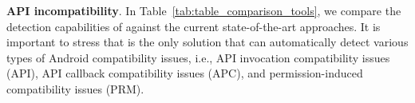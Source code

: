 \begin{comment}
These research efforts primarily focused on
behavioral differences when an app is installed on different
operating systems and/or hardware platforms.  They mainly
rely on hardware specifications and changes in the Android
documentation to uncover potential compatibility or
behavioral issues. Therefore, these approaches are not
useful when such platform related information is incomplete,
inconsistent, or unavailable.  Furthermore,  applying these
approaches to test an application on the entire vast
hardware ecosystem of Android devices may not be feasible
due to exponentially large system configurations.  Our work,
on the other hand, focuses on a more tractable and important
problem due to API evolution and how it can affect the apps
and their performance regardless of the operating system
distribution or the hardware the applications are running
on.

\end{comment}

\textbf{API incompatibility}. 
In Table~\ref{tab:table_comparison_tools}, we compare the
detection capabilities of \textsc{\@approach} against the
current state-of-the-art approaches. It is important to
stress that \@approach is the only solution that 
can automatically detect various types of
Android compatibility issues, i.e., API invocation
compatibility issues (API), API callback compatibility
issues (APC), and permission-induced compatibility issues
(PRM). %

\begin{table}%
    
    \vspace{-0.3cm}
\end{table}

